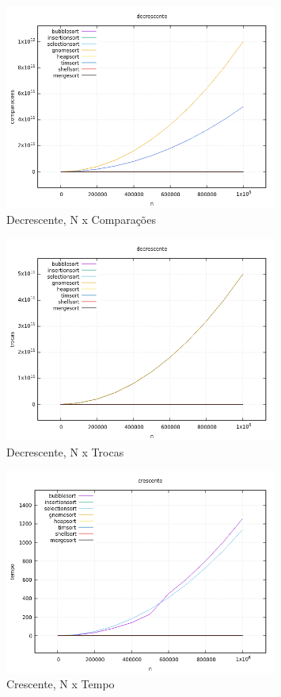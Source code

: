\documentclass[report]{uftex}
\begin{document}
\begin{figure}[h]
\centering
\caption{Decrescente, N x Comparações}
\includegraphics[width=0.8\textwidth]{graphs/decrescente-comparações.png}
\end{figure}

\begin{figure}[h]
\centering
\caption{Decrescente, N x Trocas}
\includegraphics[width=0.8\textwidth]{graphs/decrescente-trocas.png}
\end{figure}


\begin{figure}[h]
\centering
\caption{Crescente, N x Tempo}
\includegraphics[width=0.8\textwidth]{graphs/crescente-tempo.png}
\end{figure}
\end{document}
